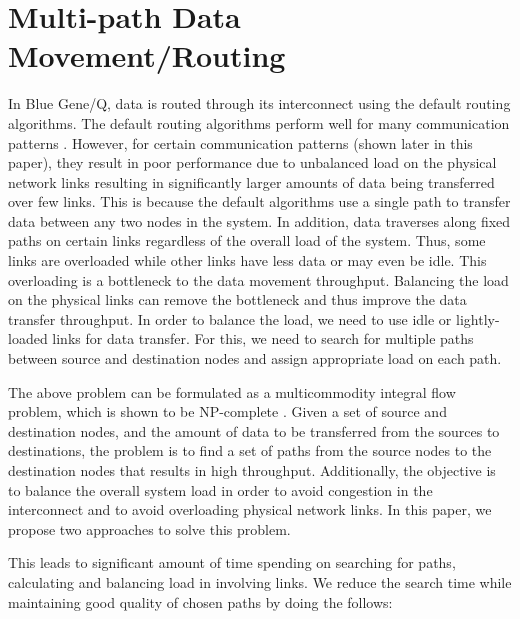 \section{Multi-path Data Movement/Routing}
\label{sec:approach}


In Blue Gene/Q, data is routed through its interconnect using the default routing algorithms. The default routing algorithms perform well for many communication patterns \cite{Chen:BGQ}. However, for certain communication patterns (shown later in this paper), they result in poor performance due to unbalanced load on the physical network links resulting in significantly larger amounts of data being transferred over few links. This is because the default algorithms use a single path to transfer data between any two nodes in the system. In addition, data traverses along fixed paths on certain links regardless of the overall load of the system. Thus, some links are overloaded while other links have less data or may even be idle. This overloading is a bottleneck to the data movement throughput. Balancing the load on the physical links can remove the bottleneck and thus improve the data transfer throughput. In order to balance the load, we need to use idle or lightly-loaded links for data transfer. For this, we need to search for multiple paths between source and destination nodes and assign appropriate load on each path.

The above problem can be formulated as a multicommodity integral flow problem, which is shown to be NP-complete \cite{even1975}. Given a set of source and destination nodes, and the amount of data to be transferred from the sources to destinations, the problem is to find a set of paths from the source nodes to the destination nodes that results in high throughput. Additionally, the objective is to balance the overall system load in order to avoid congestion in the interconnect and to avoid overloading physical network links. In this paper, we propose two approaches to solve this problem.

This leads to significant amount of time spending on searching for paths, calculating and balancing load in involving links. We reduce the search time while maintaining good quality of chosen paths by doing the follows:

